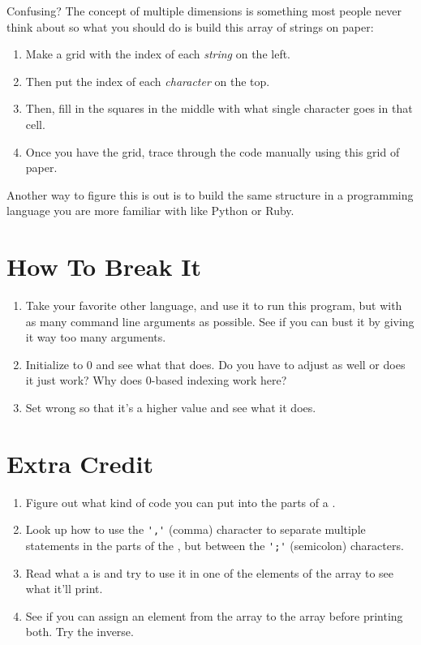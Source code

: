 Confusing? The concept of multiple dimensions is something most
people never think about so what you should do is build this
array of strings on paper:

\begin{enumerate}
\item Make a grid with the index of each \emph{string} on the left.
\item Then put the index of each \emph{character} on the top.
\item Then, fill in the squares in the middle with what single character
    goes in that cell.
\item Once you have the grid, trace through the code manually
    using this grid of paper.
\end{enumerate}

Another way to figure this is out is to build the same structure
in a programming language you are more familiar with like Python or
Ruby.

\section{How To Break It}

\begin{enumerate}
\item Take your favorite other language, and use it to run this program, but
    with as many command line arguments as possible.  See if you can bust it
    by giving it way too many arguments.
\item Initialize  to 0 and see what that does.  Do you have to adjust
     as well or does it just work?  Why does 0-based indexing work
    here?
\item Set  wrong so that it's a higher value and see what
    it does.
\end{enumerate}

\section{Extra Credit}

\begin{enumerate}
\item Figure out what kind of code you can put into the parts of a .
\item Look up how to use the \verb|','| (comma) character to separate multiple
    statements in the parts of the , but between the \verb|';'| (semicolon) characters.
\item Read what a  is and try to use it in one of the elements of the
     array to see what it'll print.
\item See if you can assign an element from the  array to the
     array before printing both.  Try the inverse.
\end{enumerate}


